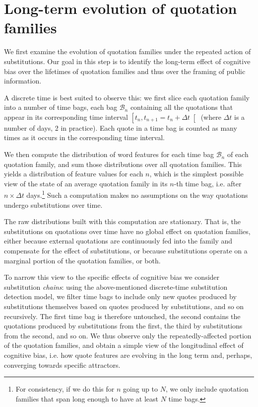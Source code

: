 \section{Long-term evolution of quotation families}

We first examine the evolution of quotation families under the repeated action of substitutions.
Our goal in this step is to identify the long-term effect of cognitive bias over the lifetimes of quotation families and thus over the framing of public information.

A discrete time is best suited to observe this: we first slice each quotation family into a number of time bags, each bag $\mathcal{B}_n$ containing all the quotations that appear in its corresponding time interval $\left[ t_n, t_{n + 1} = t_n + \Delta t \right[$ (where $\Delta t$ is a number of days, 2 in practice).
Each quote in a time bag is counted as many times as it occurs in the corresponding time interval.

We then compute the distribution of word features for each time bag $\mathcal{B}_n$ of each quotation family, and sum those distributions over all quotation families.
This yields a distribution of feature values for each $n$, which is the simplest possible view of the state of an average quotation family in its $n$-th time bag, i.e. after $n \times \Delta t$ days.\footnote{For consistency, if we do this for $n$ going up to $N$, we only include quotation families that span long enough to have at least $N$ time bags.}
Such a computation makes no assumptions on the way quotations undergo substitutions over time.

The raw distributions built with this computation are stationary.
That is, the substitutions on quotations over time have no global effect on quotation families, either because external quotations are continuously fed into the family and compensate for the effect of substitutions, or because substitutions operate on a marginal portion of the quotation families, or both.

\bigskip
To narrow this view to the specific effects of cognitive bias we consider substitution \emph{chains}: using the above-mentioned discrete-time substitution detection model, we filter time bags to include only new quotes produced by substitutions themselves based on quotes produced by substitutions, and so on recursively.
The first time bag is therefore untouched, the second contains the quotations produced by substitutions from the first, the third by substitutions from the second, and so on.  
We thus observe only the repeatedly-affected portion of the quotation families, and obtain a simple view of the longitudinal effect of cognitive bias, \hbox{i.e.} how quote features are evolving in the long term and, perhaps, converging towards specific attractors.

